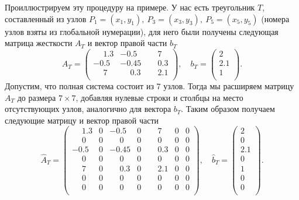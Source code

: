 \documentclass[12pt, a4paper]{article}
\begin{document}
				Проиллюстрируем эту процедуру на примере. У нас есть треугольник $T$, составленный из узлов $P_1 = (x_1, y_1), \ P_3 = (x_3, y_3), \ P_5 = (x_5, y_5)$ (номера узлов взяты из глобальной нумерации), для него были получены следующая матрица жесткости $A_T$ и вектор правой части $b_T$
				\begin{equation*}
					A_T = \begin{pmatrix}
						\phantom{-}1.3 & -0.5 & \phantom{-}7 \\
						-0.5 & -0.45 & \phantom{-}0.3 \\
						\phantom{-}7 & \phantom{-}0.3 & \phantom{-}2.1 \\
					\end{pmatrix},
					\quad
					b_T = \begin{pmatrix}
						2 \\
						2.1 \\
						1 \\
					\end{pmatrix}.
				\end{equation*}
				Допустим, что полная система состоит из 7 узлов. Тогда мы расширяем матрицу $A_T$ до размера $7 \times 7$, добавляя нулевые строки и столбцы на место отсутствующих узлов, аналогично для вектора 
				$b_T$. Таким образом получаем следующие матрицу и вектор правой части
				\begin{equation*}
					\widehat A_T = 
					\begin{pmatrix}
						\phantom{-}1.3 & 0 & -0.5         & 0 & \phantom{-}7   & 0 & 0\\
						  \phantom{-}0 & 0 & \phantom{-}0 & 0 & \phantom{-}0   & 0 & 0\\
						          -0.5 & 0 & -0.45        & 0 & \phantom{-}0.3 & 0 & 0\\
						  \phantom{-}0 & 0 & \phantom{-}0 & 0 & \phantom{-}0   & 0 & 0\\
					   	  \phantom{-}7 & 0 &\phantom{-}0.3& 0 & \phantom{-}2.1 & 0 & 0\\
						  \phantom{-}0 & 0 & \phantom{-}0 & 0 & \phantom{-}0   & 0 & 0\\
						  \phantom{-}0 & 0 & \phantom{-}0 & 0 & \phantom{-}0   & 0 & 0\\
					\end{pmatrix},
					\quad
					\widehat{b}_T = \begin{pmatrix}
						2 \\
						0 \\
						2.1 \\
						0 \\
						1 \\
						0 \\
						0 \\
					\end{pmatrix}.
				\end{equation*}
				
\end{document}
